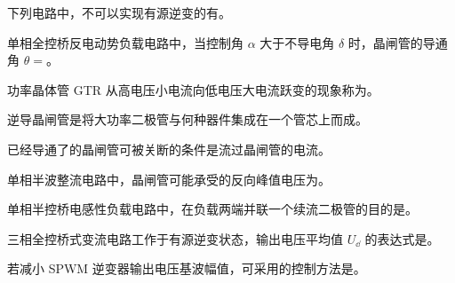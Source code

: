 \documentclass[电力电子]{subfiles}
\begin{document}
\begin{ti}
	下列电路中，不可以实现有源逆变的有。
\end{ti}

\begin{ti}
	单相全控桥反电动势负载电路中，当控制角 $\alpha$ 大于不导电角 $\delta$ 时，晶闸管的导通角 $\theta = $。
	\fourch{$\uppi - \alpha$}{$\uppi + \alpha$}{$\uppi - \delta - \alpha$}{$\uppi + \delta - \alpha$}
\end{ti}

\begin{ti}
	功率晶体管 GTR 从高电压小电流向低电压大电流跃变的现象称为。
\end{ti}

\begin{ti}
	逆导晶闸管是将大功率二极管与何种器件集成在一个管芯上而成。
\end{ti}

\begin{ti}
	已经导通了的晶闸管可被关断的条件是流过晶闸管的电流。
\end{ti}

\begin{ti}
	单相半波整流电路中，晶闸管可能承受的反向峰值电压为。
\end{ti}

\begin{ti}
	单相半控桥电感性负载电路中，在负载两端并联一个续流二极管的目的是。
\end{ti}

\begin{ti}
	三相全控桥式变流电路工作于有源逆变状态，输出电压平均值 $U_{\dd}$ 的表达式是。
\end{ti}

\begin{ti}
	若减小 SPWM 逆变器输出电压基波幅值，可采用的控制方法是。
\end{ti}
\end{document}
